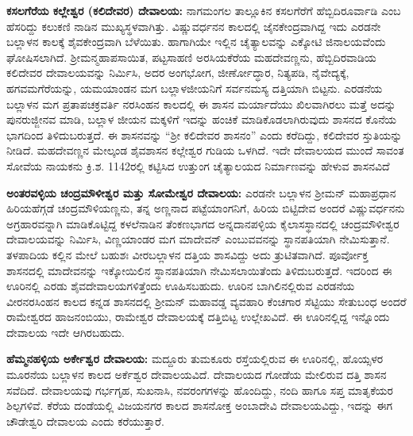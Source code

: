 \textbf{ಕಸಲಗೆರೆಯ ಕಲ್ಲೇಶ್ವರ (ಕಲಿದೇವರ) ದೇವಾಲಯ:} ನಾಗಮಂಗಲ ತಾಲ್ಲೂಕಿನ ಕಸಲಗೆರೆಗೆ ಹೆಬ್ಬಿದಿರೂರ್ವಾಡಿ ಎಂಬ ಹೆಸರಿದ್ದು ಕಲುಕಣಿ ನಾಡಿನ ಮುಖ್ಯಸ್ಥಳವಾಗಿತ್ತು. ವಿಷ್ಣುವರ್ಧನನ ಕಾಲದಲ್ಲಿ ಜೈನಕೇಂದ್ರವಾಗಿದ್ದ ಇದು ಎರಡನೇ ಬಲ್ಲಾಳನ ಕಾಲಕ್ಕೆ ಶೈವಕೇಂದ್ರವಾಗಿ ಬೆಳೆಯಿತು. ಹಾಗಾಗಿಯೇ ಇಲ್ಲಿನ ಚೈತ್ಯಾಲವನ್ನು ಎಕ್ಕೋಟಿ ಜಿನಾಲಯವೆಂದು ಘೋಷಿಸಲಾಗಿದೆ. ಶ‍್ರೀಮನ್ಮಹಾಪಸಾಯಿತ, ಪಟ್ಟಸಾಹಣಿ ಅರಸಿಯಕೆರೆಯ ಮಹದೇವಣ್ಣನು, ಹೆಬ್ಬಿದಿರವಾಡಿಯ ಕಲಿದೇವರ ದೇವಾಲಯವನ್ನು ನಿರ್ಮಿಸಿ, ಅದರ ಅಂಗಭೋಗ, ಜೀರ್ಣೋದ್ಧಾರ, ನಿತ್ಯಪಡಿ, ನೈವೇದ್ಯಕ್ಕೆ, ಹಗವಮಗೆರೆಯನ್ನು, ಯಮಯಾಂಡನ ಮಗ ಬಲ್ಲಾಳಜೀಯನಿಗೆ ಸರ್ವನಮಸ್ಯ ದತ್ತಿಯಾಗಿ ಬಿಟ್ಟನು. ಎರಡನೆಯ ಬಲ್ಲಾಳನ ಮಗ ಪ್ರತಾಪಚಕ್ರವರ್ತಿ ನರಸಿಂಹನ ಕಾಲದಲ್ಲಿ ಈ ಶಾಸನ ಮರ್ಯಾದೆಯು ಖಿಲವಾಗಿರಲು ಮತ್ತೆ ಅದನ್ನು ಪುನರುಜ್ಜೀನವ ಮಾಡಿ, ಬಲ್ಲಾಳ ಜೀಯನ ಮಕ್ಕಳಿಗೆ ಇದನ್ನು ಹಂಚಿಕೆ ಮಾಡಿಕೊಡಲಾಗಿರುವುದು ಶಾಸನದ ಕೊನೆಯ ಭಾಗದಿಂದ ತಿಳಿದುಬರುತ್ತದೆ. ಈ ಶಾಸನವನ್ನು “ಶ‍್ರೀ ಕಲಿದೇವರ ಶಾಸನಂ” ಎಂದು ಕರೆದಿದ್ದು, ಕಲಿದೇವರ ಸ್ತುತಿಯನ್ನು ನೀಡಿದೆ. ಮಹದೇವಣ್ಣನ ಮೇಲ್ಕಂಡ ಶೈವಶಾಸನ ಕಲ್ಲೇಶ್ವರ ಗುಡಿಯ ಒಳಗಿದೆ. ಇದೇ ದೇವಾಲಯದ ಮುಂದೆ ಸಾವಂತ ಸೋವೆಯ ನಾಯಕನು ಕ್ರಿ.ಶ. 1142ರಲ್ಲಿ ಕಟ್ಟಿಸಿದ ಉತ್ತುಂಗ ಚೈತ್ಯಾಲಯದ ನಿರ್ಮಾಣವನ್ನು ಹೇಳುವ ಶಾಸನವಿದೆ

\textbf{ಅಂತರವಳ್ಳಿಯ ಚಂದ್ರಮೌಳೀಶ್ವರ ಮತ್ತು ಸೋಮೇಶ್ವರ ದೇವಾಲಯ:} ಎರಡನೇ ಬಲ್ಲಾಳನ ಶ‍್ರೀಮನ್​ ಮಹಾಪ್ರಧಾನ ಹಿರಿಯಹೆಗ್ಗಡೆ ಚಂದ್ರಮೌಳಿಯಣ್ಣನು, ತನ್ನ ಅಣ್ಣನಾದ ಪಟ್ಟೆಯಾಂಗನಿಗೆ, ಹಿರಿಯ ಬಿಟ್ಟಿದೇವ ಅಂದರೆ ವಿಷ್ಣುವರ್ಧನನು ಅಗ್ರಹಾರವನ್ನಾಗಿ ಮಾಡಿಕೊಟ್ಟಿದ್ದ ಕಳಲೆನಾಡಿನ ತೆಂಕಣಭಾಗದ ಅನ್ನದಾನಪಳ್ಳಿಯ ಕೈಲಾಸಸ್ಥಾನದಲ್ಲಿ ಚಂದ್ರಮೌಳೀಶ್ವರ ದೇವಾಲಯವನ್ನು ನಿರ್ಮಿಸಿ, ವಿಣ್ಣಯಾಂಡರ ಮಗ ಮಾದೇವನ್​ ಎಂಬುವವನನ್ನು ಸ್ಥಾನಪತಿಯಾಗಿ ನೇಮಿಸುತ್ತಾನೆ.  ತಳಪಾದಿಯ ಕಲ್ಲಿನ ಮೇಲೆ ಬಹುಶಃ ವೀರಬಲ್ಲಾಳನ ದತ್ತಿಯ ಶಾಸವಿದ್ದು ಅದು ತ್ರುಟಿತವಾಗಿದೆ. ಪೂರ್ವೋಕ್ತ ಶಾಸನದಲ್ಲಿ ಮಾದೇವನನ್ನು ಇಕ್ಕೋಯಿಲಿನ ಸ್ಥಾನಪತಿಯಾಗಿ ನೇಮಿಸಲಾಯಿತೆಂದು ತಿಳಿದುಬರುತ್ತದೆ. ಇದರಿಂದ ಈ ಊರಿನಲ್ಲಿ ಎರಡು ಶೈವದೇವಾಲಯಗಳಿತ್ತೆಂದು ಊಹಿಸಬಹುದು. ಊರಿನ ಬಾಗಿಲಿನಲ್ಲಿರುವ ಎರಡನೆಯ ವೀರನರಸಿಂಹನ ಕಾಲದ ಕನ್ನಡ ಶಾಸನದಲ್ಲಿ ಶ‍್ರೀಮನ್​ ಮಹಾವಡ್ಡ ವ್ಯವಹಾರಿ ಕೆಂಚಗಾರ ಸೆಟ್ಟಿಯು ಸೇತುಬಂಧ ಅಂದರೆ ರಾಮೇಶ್ವರದ ಹಾಜನಂಬಿಯು, ರಾಮೇಶ್ವರ ದೇವಾಲಯಕ್ಕೆ ದತ್ತಿಬಿಟ್ಟ ಉಲ್ಲೇಖವಿದೆ. ಈ ಊರಿನಲ್ಲಿದ್ದ ಇನ್ನೊಂದು ದೇವಾಲಯ ಇದೇ ಆಗಿರಬಹುದು. 

\textbf{ಹೆಮ್ಮನಹಳ್ಳಿಯ ಅರ್ಕೇಶ್ವರ ದೇವಾಲಯ:} ಮದ್ದೂರು ತುಮಕೂರು ರಸ್ತೆಯಲ್ಲಿರುವ ಈ ಊರಿನಲ್ಲಿ, ಹೊಯ್ಸಳರ ಮೂರನೆಯ ಬಲ್ಲಾಳನ ಕಾಲದ ಅರ್ಕೆಶ್ವರ ದೇವಾಲಯವಿದೆ. ದೇವಾಲಯದ ಗೋಡೆಯ ಮೇಲಿರುವ ದತ್ತಿ ಶಾಸನ ಸವೆದಿದೆ. ದೇವಾಲಯವು ಗರ್ಭಗೃಹ, ಸುಖನಾಸಿ, ನವರಂಗಗಳನ್ನು ಹೊಂದಿದ್ದು, ನಂದಿ ಹಾಗೂ ಸಪ್ತ ಮಾತೃಕೆಯರ ಶಿಲ್ಪಗಳಿವೆ. ಕೆರೆಯ ದಂಡೆಯಲ್ಲಿ ವಿಜಯನಗರ ಕಾಲದ ಶಾಸನೋಕ್ತ ಅಂಬಾದೇವಿ ದೇವಾಲಯವಿದ್ದು, ಇದನ್ನು ಈಗ ಚೌಡೇಶ್ವರಿ ದೇವಾಲಯ ಎಂದು ಕರೆಯುತ್ತಾರೆ.

